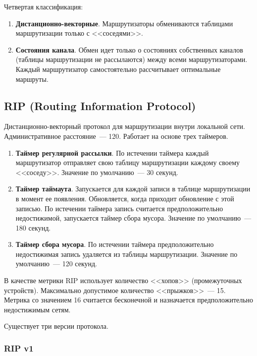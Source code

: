 Четвертая классификация:

\begin{enumerate}
    \item \textbf{Дистанционно-векторные}. Маршрутизаторы обмениваются таблицами маршрутизации только с <<соседями>>.
    \item \textbf{Состояния канала}. Обмен идет только о состояниях собственных каналов (таблицы маршрутизации не рассылаются) между всеми маршрутизаторами. Каждый маршрутизатор самостоятельно рассчитывает оптимальные маршруты.
\end{enumerate}

\subsection{RIP (Routing Information Protocol)}

Дистанционно-векторный протокол для маршрутизации внутри локальной сети. Административное расстояние~--- 120. Работает на основе трех таймеров.

\begin{enumerate}
    \item \textbf{Таймер регулярной рассылки}. По истечении таймера каждый маршрутизатор отправляет свою таблицу маршрутизации каждому своему <<соседу>>. Значение по умолчанию~--- 30 секунд.
    \item \textbf{Таймер таймаута}. Запускается для каждой записи в таблице маршрутизации в момент ее появления. Обновляется, когда приходит обновление с этой записью. По истечении таймера запись считается предположительно недостижимой, запускается таймер сбора мусора. Значение по умолчанию~--- 180 секунд.
    \item \textbf{Таймер сбора мусора}. По истечении таймера предположительно недостижимая запись удаляется из таблицы маршрутизации. Значение по умолчанию~--- 120 секунд.
\end{enumerate}

В качестве метрики RIP использует количество <<хопов>> (промежуточных устройств). Максимально допустимое количество <<прыжков>>~--- 15. Метрика со значением 16 считается бесконечной и назначается предположительно недостижимым сетям.

Существует три версии протокола.

\subsubsection{RIP v1}

